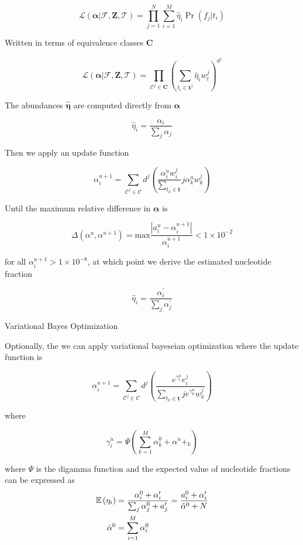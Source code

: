 \[\mathcal{L} \left( \pmb{\alpha} |\mathcal{F}, \pmb{Z},\mathcal{T} \right)  = \prod^{N}_{j=1} \sum^{M}_{i=1} \hat \eta_i \Pr\left(  f_j|t_i\right)\]

Written in terms of equivalence classes \(\pmb{C}\)

\[\mathcal{L} \left( \pmb{\alpha} |\mathcal{F}, \pmb{Z},\mathcal{T} \right)  = \prod^{}_{\mathcal{C}^j \in \pmb{C}} \left( \sum_{t_i \in  \pmb{t}^j} \hat \eta_i w_t^j\right) ^{d^{j}}\]

The abundances \(\pmb{\hat \eta}\) are computed directly from
\(\pmb{\alpha}\)

\[\hat \eta_i= \dfrac{\alpha_i}{\sum_j \alpha_j}\]

Then we apply an update function

\[\alpha_i ^{u+1} = \sum^{}_{\mathcal{C}^j \in \pmb{\mathcal{C}}} d ^{j} \left( \dfrac{\alpha_i^u w_i^j}{\sum^{}_{t_k \in \pmb{t}}} j \alpha^u_k w_k^j\right)\]

Until the maximum relative difference in \( \pmb{\alpha}\) is

\[\Delta \left( \alpha^u, \alpha ^{u+1} \right) = \mathrm{max} \dfrac{\left| a_i^u  - \alpha_i ^{u+1}\right| }{ \alpha_i ^{u+1}} < 1 \times 10 ^{-2}\]

for all \(\alpha_i ^{u+1} > 1 \times 10 ^{-8}\), at which point we
derive the estimated nucleotide fraction

\[\hat \eta_i =\dfrac{\alpha_i ^{\prime} }{ \sum_j \alpha ^{\prime} _j}\]

Variational Bayes Optimization

Optionally, the we can apply variational bayeseian optimization where
the update function is

\[\alpha_i ^{u+1} = \sum^{}_{\mathcal{C}^j \in \pmb{\mathcal{C}}} d ^{j} \left( \dfrac{e ^{ \gamma ^u_i} e_i^j}{\sum^{}_{t_k \in \pmb{t}} j e ^{\gamma ^u _k}w^j_k} \right)\]

where

\[\gamma^u_i = \Psi \left( \sum^{M}_{k=1} \alpha^0_k + \alpha^u+_k \right)\]

where \(\Psi\) is the digamma function and the expected value of
nucleotide fractions can be expressed as
\[
$$
\begin{align*}
	\mathbb{E} \left( \eta_i \right) &= \dfrac{\alpha_i^0 + \alpha_i ^{\prime} }{\sum^{}_{j} \alpha^0_j + a ^{\prime} _j}= \dfrac{a_i^0 + \alpha_i ^{\prime} }{\hat \alpha^0 +N}\\
	\hat \alpha^0 &= \sum^{M}_{i = 1} \alpha_i^0
\end{align*}
$$
\]